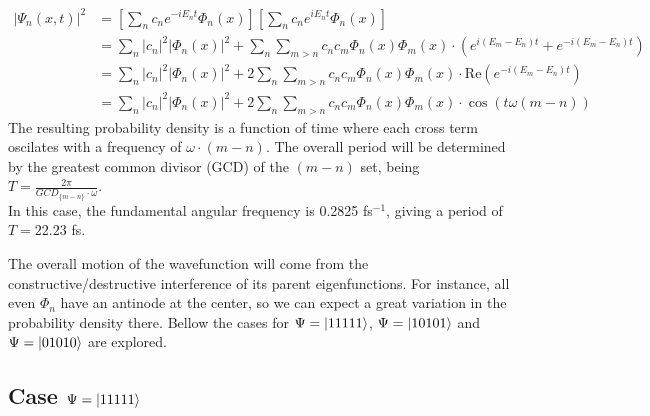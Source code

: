 \documentclass{cis320}
\begin{document}
\[
\begin{aligned}
|\Psi_{n}(x,t)|^2 &= \left[\sum_{n} c_n e^{-iE_nt} \Phi_n(x)\right] \left[\sum_{n} c_n e^{iE_nt} \Phi_n(x)\right] \\
&= \sum_n |c_n|^2 |\Phi_n(x)|^2 + \sum_n \sum_{m>n} c_n c_m \Phi_n(x) \Phi_m(x) \cdot \left(e^{i(E_m-E_n)t}+e^{-i(E_m-E_n)t}\right) \\
&= \sum_n |c_n|^2 |\Phi_n(x)|^2 + 2\sum_n \sum_{m>n} c_n c_m \Phi_n(x) \Phi_m(x) \cdot \text{Re}\left(e^{-i(E_m-E_n)t}\right) \\
&= \sum_n |c_n|^2 |\Phi_n(x)|^2 + 2 \sum_n \sum_{m>n} c_n c_m \Phi_n(x) \Phi_m(x) \cdot \cos(t\omega(m-n))
\end{aligned}
\]
The resulting probability density is a function of time where each cross term oscilates with a frequency of $\omega \cdot (m-n)$. The overall period will be determined by the greatest common divisor (GCD) of the $(m-n)$ set, being $T=\frac{2\pi}{GCD_{\{m-n\}}\cdot\omega}$. \\
In this case, the fundamental angular frequency is 0.2825 fs$^{-1}$, giving a period of $T=22.23$ fs.\\
\par
The overall motion of the wavefunction will come from the constructive/destructive interference of its parent eigenfunctions. For instance, all even $\Phi_n$ have an antinode at the center, so we can expect a great variation in the probability density there. Bellow the cases for $\Psi = \ket{11111}$, $\Psi = \ket{10101}$ and $\Psi = \ket{01010}$ are explored.


\subsection{Case $\Psi = \ket{11111}$}
\end{document}
